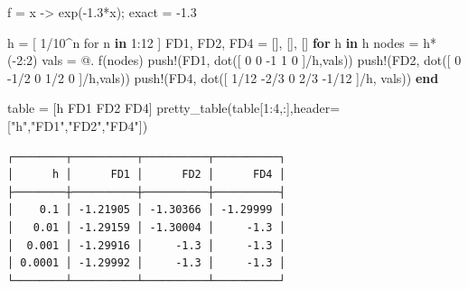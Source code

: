 \documentclass[
]{article}
\newenvironment{Shaded}{\begin{snugshade}}{\end{snugshade}}
\newcommand{\ControlFlowTok}[1]{\textcolor[rgb]{0.00,0.23,0.31}{\textbf{#1}}}
\newcommand{\FloatTok}[1]{\textcolor[rgb]{0.68,0.00,0.00}{#1}}
\newcommand{\FunctionTok}[1]{\textcolor[rgb]{0.28,0.35,0.67}{#1}}
\newcommand{\KeywordTok}[1]{\textcolor[rgb]{0.00,0.23,0.31}{\textbf{#1}}}
\newcommand{\NormalTok}[1]{\textcolor[rgb]{0.00,0.23,0.31}{#1}}
\newcommand{\OperatorTok}[1]{\textcolor[rgb]{0.37,0.37,0.37}{#1}}
\newcommand{\StringTok}[1]{\textcolor[rgb]{0.13,0.47,0.30}{#1}}
\begin{document}
\begin{Shaded}
\begin{Highlighting}[]
\NormalTok{f }\OperatorTok{=}\NormalTok{ x }\OperatorTok{{-}\textgreater{}} \FunctionTok{exp}\NormalTok{(}\OperatorTok{{-}}\FloatTok{1.3}\OperatorTok{*}\NormalTok{x);}
\NormalTok{exact }\OperatorTok{=} \OperatorTok{{-}}\FloatTok{1.3}

\NormalTok{h }\OperatorTok{=}\NormalTok{ [ }\FloatTok{1}\OperatorTok{/}\FloatTok{10}\OperatorTok{\^{}}\NormalTok{n for n }\KeywordTok{in} \FloatTok{1}\OperatorTok{:}\FloatTok{12}\NormalTok{ ]}
\NormalTok{FD1, FD2, FD4 }\OperatorTok{=}\NormalTok{ [], [], []}
\ControlFlowTok{for}\NormalTok{ h }\KeywordTok{in}\NormalTok{ h }
\NormalTok{    nodes }\OperatorTok{=} \FunctionTok{h*}\NormalTok{(}\OperatorTok{{-}}\FloatTok{2}\OperatorTok{:}\FloatTok{2}\NormalTok{)}
\NormalTok{    vals }\OperatorTok{=}\NormalTok{ @. }\FunctionTok{f}\NormalTok{(nodes)}
    \FunctionTok{push!}\NormalTok{(FD1, }\FunctionTok{dot}\NormalTok{([ }\FloatTok{0} \FloatTok{0} \OperatorTok{{-}}\FloatTok{1} \FloatTok{1} \FloatTok{0}\NormalTok{ ]}\OperatorTok{/}\NormalTok{h,vals))}
    \FunctionTok{push!}\NormalTok{(FD2, }\FunctionTok{dot}\NormalTok{([ }\FloatTok{0} \OperatorTok{{-}}\FloatTok{1}\OperatorTok{/}\FloatTok{2} \FloatTok{0} \FloatTok{1}\OperatorTok{/}\FloatTok{2} \FloatTok{0}\NormalTok{ ]}\OperatorTok{/}\NormalTok{h,vals))}
    \FunctionTok{push!}\NormalTok{(FD4, }\FunctionTok{dot}\NormalTok{([ }\FloatTok{1}\OperatorTok{/}\FloatTok{12} \OperatorTok{{-}}\FloatTok{2}\OperatorTok{/}\FloatTok{3} \FloatTok{0} \FloatTok{2}\OperatorTok{/}\FloatTok{3} \OperatorTok{{-}}\FloatTok{1}\OperatorTok{/}\FloatTok{12}\NormalTok{ ]}\OperatorTok{/}\NormalTok{h, vals))}
\ControlFlowTok{end}

\NormalTok{table }\OperatorTok{=}\NormalTok{ [h FD1 FD2 FD4]}
\FunctionTok{pretty\_table}\NormalTok{(table[}\FloatTok{1}\OperatorTok{:}\FloatTok{4}\NormalTok{,}\OperatorTok{:}\NormalTok{],header}\OperatorTok{=}\NormalTok{[}\StringTok{"h"}\NormalTok{,}\StringTok{"FD1"}\NormalTok{,}\StringTok{"FD2"}\NormalTok{,}\StringTok{"FD4"}\NormalTok{])}
\end{Highlighting}
\end{Shaded}

\begin{verbatim}
┌────────┬──────────┬──────────┬──────────┐
│      h │      FD1 │      FD2 │      FD4 │
├────────┼──────────┼──────────┼──────────┤
│    0.1 │ -1.21905 │ -1.30366 │ -1.29999 │
│   0.01 │ -1.29159 │ -1.30004 │     -1.3 │
│  0.001 │ -1.29916 │     -1.3 │     -1.3 │
│ 0.0001 │ -1.29992 │     -1.3 │     -1.3 │
└────────┴──────────┴──────────┴──────────┘
\end{verbatim}
\end{document}
